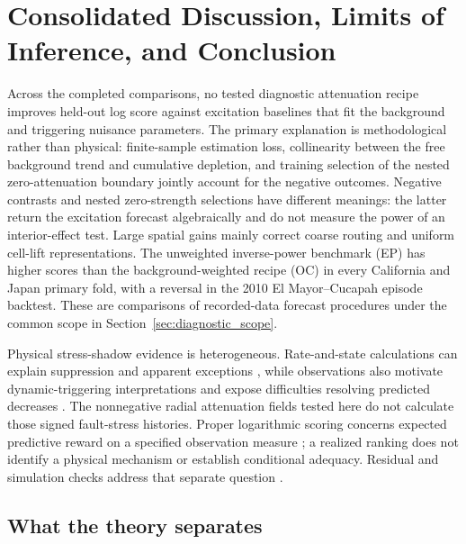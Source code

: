 \chapter{Consolidated Discussion, Limits of Inference, and Conclusion}
\label{ch:discussion}\label{ch:conclusion}\label{chap:discussion}

Across the completed comparisons, no tested diagnostic attenuation recipe improves held-out log score against excitation baselines that fit the background and triggering nuisance parameters. The primary explanation is methodological rather than physical: finite-sample estimation loss, collinearity between the free background trend and cumulative depletion, and training selection of the nested zero-attenuation boundary jointly account for the negative outcomes. Negative contrasts and nested zero-strength selections have different meanings: the latter return the excitation forecast algebraically and do not measure the power of an interior-effect test. Large spatial gains mainly correct coarse routing and uniform cell-lift representations. The unweighted inverse-power benchmark (EP) has higher scores than the background-weighted recipe (OC) in every California and Japan primary fold, with a reversal in the 2010 El Mayor--Cucapah episode backtest. These are comparisons of recorded-data forecast procedures under the common scope in Section~\ref{sec:diagnostic_scope}.

Physical stress-shadow evidence is heterogeneous. Rate-and-state calculations
can explain suppression and apparent exceptions \citep{HarrisSimpson1998},
while observations also motivate dynamic-triggering interpretations
\citep{FelzerBrodsky2006} and expose difficulties resolving predicted
decreases \citep{MallmanZoback2007}. The nonnegative radial attenuation fields
tested here do not calculate those signed fault-stress histories. Proper
logarithmic scoring concerns expected predictive reward on a specified
observation measure \citep{GneitingRaftery2007}; a realized ranking does not
identify a physical mechanism or establish conditional adequacy. Residual and
simulation checks address that separate question \citep{BraySchoenberg2013}.
\section{What the theory separates}

